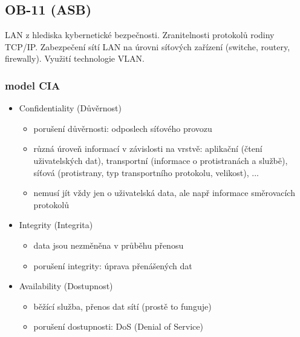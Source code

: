 \subsection{OB-11 (ASB)}
LAN z hlediska kybernetické bezpečnosti. Zranitelnosti protokolů rodiny TCP/IP. Zabezpečení sítí LAN na úrovni síťových zařízení (switche, routery, firewally). Využití technologie VLAN.

\subsubsection*{model CIA}
\begin{itemize}
	\item Confidentiality (Důvěrnost)
	\begin{itemize}
		\item porušení důvěrnosti: odposlech síťového provozu
		\item různá úroveň informací v závislosti na vrstvě: aplikační (čtení uživatelských dat), transportní (informace o protistranách a službě), síťová (protistrany, typ transportního protokolu, velikost), ...
		\item nemusí jít vždy jen o uživatelská data, ale např informace směrovacích protokolů
	\end{itemize}
	\item Integrity (Integrita)
	\begin{itemize}
		\item data jsou nezměněna v průběhu přenosu
		\item porušení integrity: úprava přenášených dat
	\end{itemize}
	\item Availability (Dostupnost)
	\begin{itemize}
		\item běžící služba, přenos dat sítí (prostě to funguje)
		\item porušení dostupnosti: DoS (Denial of Service)
	\end{itemize}
\end{itemize}

